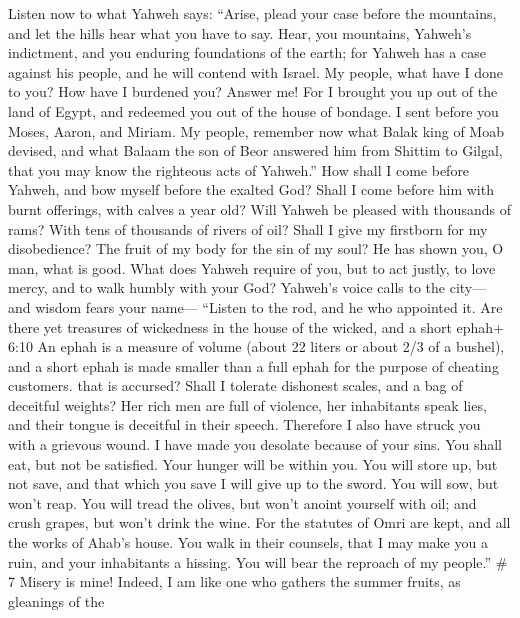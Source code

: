  Listen now to what Yahweh says: ``Arise, plead your case
before the mountains, and let the hills hear what you have to say.
 Hear, you mountains, Yahweh's indictment, and you enduring
foundations of the earth; for Yahweh has a case against his people, and
he will contend with Israel.  My people, what have I done to
you? How have I burdened you? Answer me!  For I brought you
up out of the land of Egypt, and redeemed you out of the house of
bondage. I sent before you Moses, Aaron, and Miriam.  My
people, remember now what Balak king of Moab devised, and what Balaam
the son of Beor answered him from Shittim to Gilgal, that you may know
the righteous acts of Yahweh.''  How shall I come before
Yahweh, and bow myself before the exalted God? Shall I come before him
with burnt offerings, with calves a year old?  Will Yahweh
be pleased with thousands of rams? With tens of thousands of rivers of
oil? Shall I give my firstborn for my disobedience? The fruit of my body
for the sin of my soul?  He has shown you, O man, what is
good. What does Yahweh require of you, but to act justly, to love mercy,
and to walk humbly with your God?  Yahweh's voice calls to
the city--- and wisdom fears your name--- ``Listen to the rod, and he
who appointed it.  Are there yet treasures of wickedness in
the house of the wicked, and a short ephah+ 6:10 An ephah is a measure
of volume (about 22 liters or about 2/3 of a bushel), and a short ephah
is made smaller than a full ephah for the purpose of cheating customers.
that is accursed?  Shall I tolerate dishonest scales, and a
bag of deceitful weights?  Her rich men are full of
violence, her inhabitants speak lies, and their tongue is deceitful in
their speech.  Therefore I also have struck you with a
grievous wound. I have made you desolate because of your sins.
 You shall eat, but not be satisfied. Your hunger will be
within you. You will store up, but not save, and that which you save I
will give up to the sword.  You will sow, but won't reap.
You will tread the olives, but won't anoint yourself with oil; and crush
grapes, but won't drink the wine.  For the statutes of Omri
are kept, and all the works of Ahab's house. You walk in their counsels,
that I may make you a ruin, and your inhabitants a hissing. You will
bear the reproach of my people.'' \# 7  Misery is mine!
Indeed, I am like one who gathers the summer fruits, as gleanings of the
